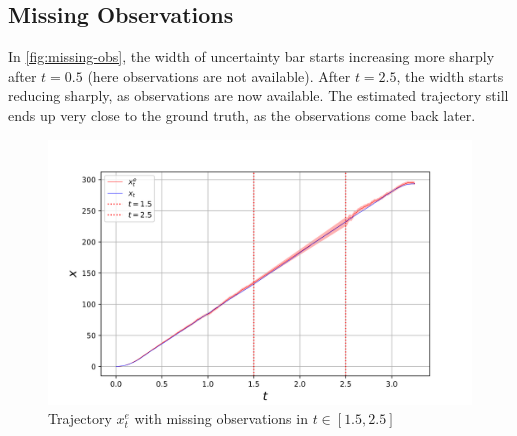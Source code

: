 \subsection{Missing Observations}
In \autoref{fig:missing-obs}, the width of uncertainty bar starts increasing more sharply after $t = 0.5$ (here observations are not available). After $t = 2.5$, the width starts reducing sharply, as observations are now available. The estimated trajectory still ends up very close to the ground truth, as the observations come back later.
\begin{figure}[H]
    \centering
    \includegraphics[width=1.0\linewidth]{plots/part1-f.png}
    \caption{Trajectory $x_t^e$ with missing observations in $t \in [1.5, 2.5]$}
    \label{fig:missing-obs}
\end{figure}
